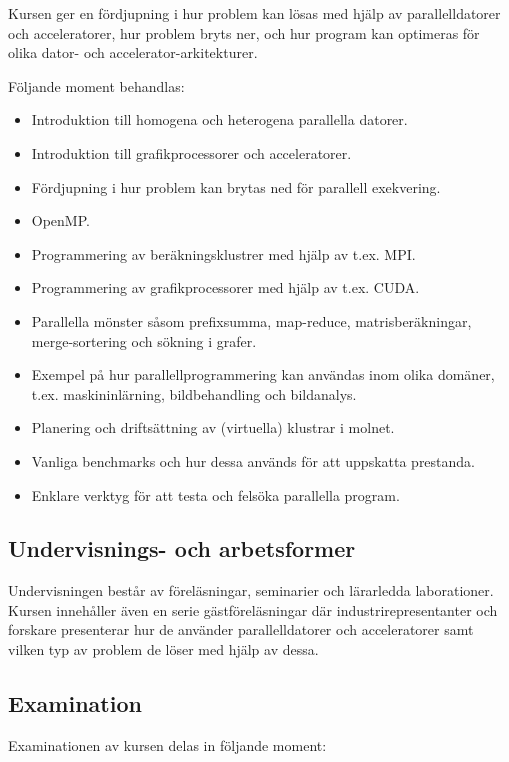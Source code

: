 Kursen ger en fördjupning i hur problem kan lösas med hjälp av
parallelldatorer och acceleratorer, hur problem bryts ner, och hur
program kan optimeras för olika dator- och accelerator-arkitekturer.

Följande moment behandlas:

\begin{itemize}
\tightlist
\item
  Introduktion till homogena och heterogena parallella datorer.
\item
  Introduktion till grafikprocessorer och acceleratorer.
\item
  Fördjupning i hur problem kan brytas ned för parallell exekvering.
\item
  OpenMP.
\item
  Programmering av beräkningsklustrer med hjälp av t.ex. MPI.
\item
  Programmering av grafikprocessorer med hjälp av t.ex. CUDA.
\item
  Parallella mönster såsom prefixsumma, map-reduce, matrisberäkningar,
  merge-sortering och sökning i grafer.
\item
  Exempel på hur parallellprogrammering kan användas inom olika domäner,
  t.ex. maskininlärning, bildbehandling och bildanalys.
\item
  Planering och driftsättning av (virtuella) klustrar i molnet.
\item
  Vanliga benchmarks och hur dessa används för att uppskatta prestanda.
\item
  Enklare verktyg för att testa och felsöka parallella program.
\end{itemize}

\subsection*{Undervisnings- och
arbetsformer}

Undervisningen består av föreläsningar, seminarier och lärarledda
laborationer. Kursen innehåller även en serie gästföreläsningar där
industrirepresentanter och forskare presenterar hur de använder
parallelldatorer och acceleratorer samt vilken typ av problem de löser
med hjälp av dessa.

\subsection*{Examination}

Examinationen av kursen delas in följande moment:


